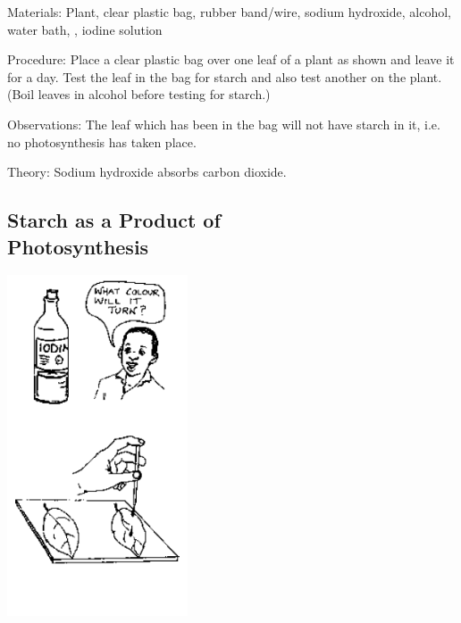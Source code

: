 \begin{multicols}{2}
\begin{description*}
\item[Materials:]{Plant, clear plastic bag, rubber band/wire, sodium hydroxide, alcohol, water bath, , iodine solution}
\item[Procedure:]{Place a clear plastic bag over one
leaf of a plant as shown and leave
it for a day. Test the leaf in the
bag for starch and also test
another on the plant. (Boil leaves
in alcohol before testing for
starch.) }
\item[Observations:]{The leaf which has been
in the bag will not have starch in
it, i.e. no photosynthesis has
taken place.}
\item[Theory:]{Sodium hydroxide absorbs carbon dioxide.}
\end{description*}

\columnbreak

\subsection[Starch as a Product of Photosynthesis]{Starch as a Product of \hfill \\ Photosynthesis} %

\begin{center}
\includegraphics[width=0.4\textwidth]{./img/source/photo-starch.png}
\end{center}


\end{multicols}
